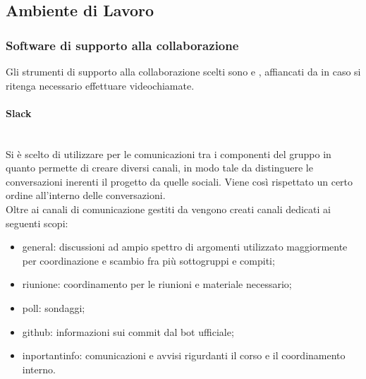 \subsection{Ambiente di Lavoro}

\subsubsection{Software di supporto alla collaborazione}
Gli strumenti di supporto alla collaborazione scelti sono  e , affiancati da  in caso si ritenga necessario effettuare videochiamate.

\paragraph{Slack}\mbox{}\\
Si è scelto di utilizzare  per le comunicazioni tra i componenti del gruppo in quanto permette di creare diversi canali, in modo tale da distinguere le conversazioni inerenti il progetto da quelle sociali. Viene così rispettato un certo ordine all'interno delle conversazioni.\\
Oltre ai canali di comunicazione gestiti da \Proponente vengono creati canali dedicati ai seguenti scopi:
\begin{itemize}
	\item general: discussioni ad ampio spettro di argomenti utilizzato maggiormente per coordinazione e scambio fra più sottogruppi e compiti;
	\item riunione: coordinamento per le riunioni e materiale necessario;
	\item poll: sondaggi;
	\item github: informazioni sui commit dal bot ufficiale;
	\item inportantinfo: comunicazioni e avvisi rigurdanti il corso e il coordinamento interno.
\end{itemize}

